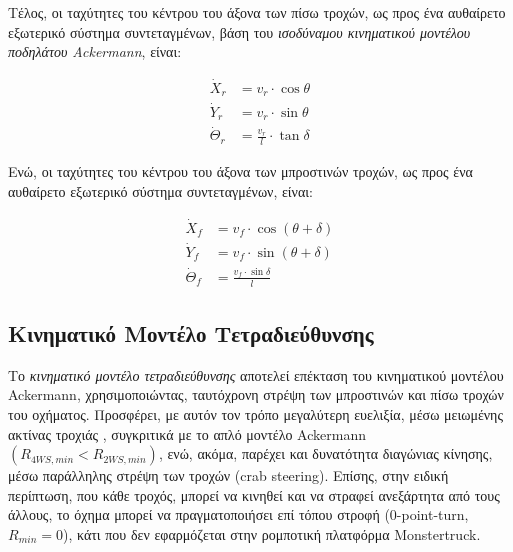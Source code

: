 {\bigskip
Τέλος, οι ταχύτητες του κέντρου του άξονα των πίσω τροχών, ως προς ένα αυθαίρετο εξωτερικό σύστημα συντεταγμένων, βάση του \textit{ισοδύναμου κινηματικού μοντέλου ποδηλάτου Ackermann}, είναι:

\begin{align}
	\dot X_r &= v_r \cdot \cos\theta\\
	\dot Y_r &= v_r \cdot \sin\theta\\
	\dot \Theta_r &= \frac{v_r}{l} \cdot \tan\delta
\end{align}

Ενώ, οι ταχύτητες του κέντρου του άξονα των μπροστινών τροχών, ως προς ένα αυθαίρετο εξωτερικό σύστημα συντεταγμένων, είναι:

\begin{align}
	\dot X_f &= v_f \cdot \cos(\theta+\delta)\\
	\dot Y_f &= v_f \cdot \sin(\theta+\delta)\\
	\dot \Theta_f &= \frac{v_f \cdot \sin\delta}{l}
\end{align}


\bigskip
\subsection{Κινηματικό Μοντέλο Τετραδιεύθυνσης} \label{ssec:4ws_kinematics}
Το \textit{κινηματικό μοντέλο τετραδιεύθυνσης} αποτελεί επέκταση του {κινηματικού μοντέλου Ackermann}, χρησιμοποιώντας, ταυτόχρονη στρέψη των μπροστινών και πίσω τροχών του οχήματος. Προσφέρει, με αυτόν τον τρόπο μεγαλύτερη ευελιξία, μέσω μειωμένης ακτίνας τροχιάς , συγκριτικά με το απλό {μοντέλο Ackermann} $(R_{4WS, min} < R_{2WS, min})$, ενώ, ακόμα, παρέχει και δυνατότητα  διαγώνιας κίνησης, μέσω παράλληλης στρέψη των τροχών (crab steering). Επίσης, στην ειδική περίπτωση, που κάθε τροχός, μπορεί να κινηθεί και να στραφεί ανεξάρτητα από τους άλλους, το όχημα μπορεί να πραγματοποιήσει επί τόπου στροφή (0-point-turn, $R_{min}=0$), κάτι που δεν εφαρμόζεται στην ρομποτική πλατφόρμα {Monstertruck}.

}
